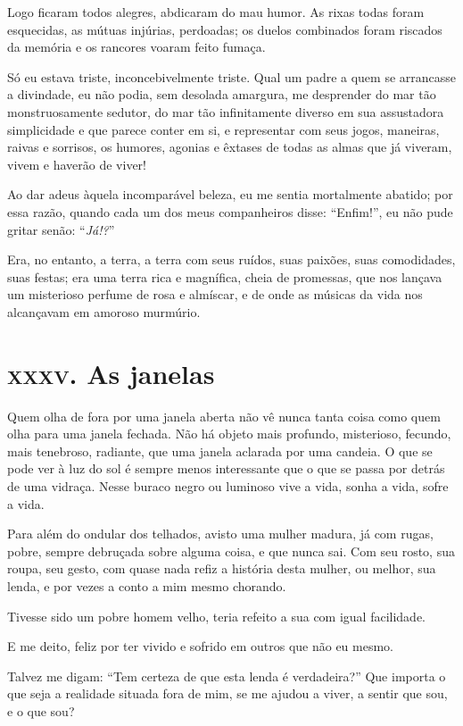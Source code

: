 Logo ficaram todos alegres, abdicaram do mau humor.
As rixas todas foram esquecidas, as mútuas injúrias, perdoadas; os duelos combinados foram riscados da memória e os rancores voaram
feito fumaça.

Só eu estava triste, inconcebivelmente triste. Qual um padre a
quem se arrancasse a divindade, eu não podia, sem desolada amargura, me
desprender do mar tão monstruosamente sedutor, do mar tão
infinitamente diverso em sua assustadora simplicidade e que parece
conter em si, e representar com seus jogos, maneiras, raivas e
sorrisos, os humores, agonias e êxtases de todas as almas
que já viveram, vivem e haverão de viver!

Ao dar adeus àquela incomparável beleza, eu me sentia mortalmente abatido;
por essa razão, quando cada um dos meus companheiros disse:
“Enfim!'', eu não pude gritar senão:
“\textit{Já!?}'' 

Era, no entanto, a terra, a terra com seus ruídos, suas paixões, suas
comodidades, suas festas; era uma terra rica e magnífica, cheia de
promessas, que nos lançava um misterioso perfume de rosa e almíscar,
e de onde as músicas da vida nos alcançavam em amoroso murmúrio.

\chapter{\textsc{xxxv.} As janelas}

Quem olha de fora por uma janela aberta não vê nunca
tanta coisa como quem olha para uma janela fechada. Não há objeto
mais profundo, misterioso, fecundo, mais tenebroso,
radiante, que uma janela aclarada por uma candeia. O que se pode ver
à luz do sol é sempre menos interessante que o que se passa por
detrás de uma vidraça. Nesse buraco negro ou luminoso vive a vida,
sonha a vida, sofre a vida.

Para além do ondular dos telhados, avisto uma mulher madura, já com
rugas, pobre, sempre debruçada sobre alguma coisa, e que nunca sai. Com
seu rosto, sua roupa, seu gesto, com quase nada refiz a
história desta mulher, ou melhor, sua lenda, e por vezes a conto a mim
mesmo chorando.

Tivesse sido um pobre homem velho, teria refeito a sua com igual
facilidade.

E me deito, feliz por ter vivido e sofrido em outros que não eu mesmo.

Talvez me digam: “Tem certeza de que esta lenda é
verdadeira?'' Que importa o que seja a realidade
situada fora de mim, se me ajudou a viver, a sentir que sou, e o que
sou?

